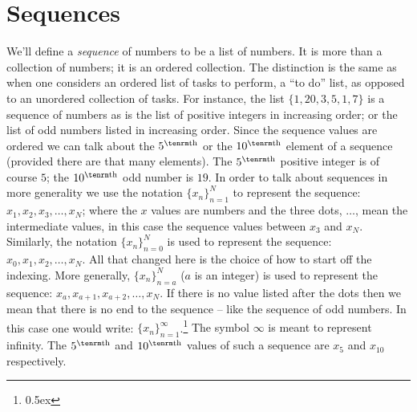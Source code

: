 \section{Sequences}
We'll define a {\it sequence\/} of numbers to be a list of numbers. 
It is more than a collection of numbers; it is an ordered 
collection. The distinction is the same as when one considers an ordered list of tasks to perform, a ``to do'' list,
as opposed to an unordered collection of tasks.
For instance, the list $\{1,20,3,5,1,7\}$ is a sequence of numbers as is the list of
positive integers in increasing order; or the list of odd numbers listed in increasing order.
Since the sequence values 
are ordered we can talk about the $5^{\rm th}$ or the $10^{\rm th}$ element of a sequence (provided there are
that many elements). The $5^{\rm th}$ positive integer
is of course $5$; the $10^{\rm th}$ odd number is $19$.
In order to talk about sequences in more generality we use the notation 
$\{x_n\}_{n=1}^{N}$ to represent the sequence: 
$x_1, x_2, x_3, \ldots, x_N$; where the $x$ values are numbers and the three dots, $\ldots$, 
mean the intermediate values, in this case the sequence values between $x_3$ and $x_N$. 
Similarly, the notation $\{x_n\}_{n=0}^{N}$ is used 
to represent the sequence: $x_0, x_{1}, x_{2}, \ldots, x_N$. All that changed here 
is the choice of how to start off the indexing. More generally,
$\{x_n\}_{n=a}^{N}$ ($a$ is an integer) is used to represent the sequence:
$x_a, x_{a+1}, x_{a+2}, \ldots, x_N$. If there is no value listed after the dots then we mean that 
there is no end to the sequence -- like the sequence of odd numbers. 
In this case one would write: $\{x_n\}_{n=1}^{\infty}$.\footnote{\kern 0.5pt \raise 0.5ex \hbox{\dag}}%
{The symbol $\infty$ is meant to represent infinity.} The $5^{\rm th}$ and $10^{\rm th}$ values of 
such a sequence are $x_5$ and $x_{10}$ respectively.

